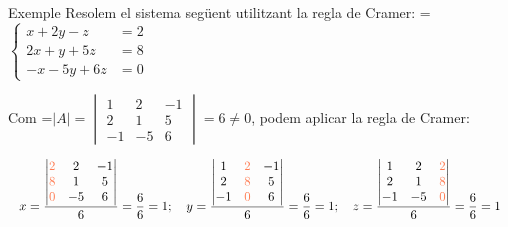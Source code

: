 \documentclass[11pt,a4paper]{article}
\newcommand{\fmm}[1]{\setbox0=\hbox{$#1$}\ifdim\wd0>\linewidth\fmdisp{#1}\else\mbox{\box0}\fi}
\newcommand{\fmdisp}[1]{\[\setbox2=\hbox{$\displaystyle #1$}\ifdim\wd2>\linewidth\resizebox{\linewidth}{!}{\box2}\else\box2\fi\]}
\begin{document}
\begin{fmex}{Exemple}
Resolem el sistema següent utilitzant la regla de Cramer: \fmm{\left\{\begin{aligned}x+2y-z&=2\\ 2x+y+5z&=8\\ -x-5y+6z&=0\end{aligned}\right.}

Com \fmm{|A|=\begin{vmatrix}1 & 2 & -1\\ 2 & 1 & 5\\ -1 & -5 & 6\end{vmatrix}=6\neq0}, podem aplicar la regla de Cramer:

\fmdisp{x=\frac{\begin{vmatrix}\color[HTML]{ff7a50}2 & 2 & -1\\ \color[HTML]{ff7a50}8 & 1 & 5\\ \color[HTML]{ff7a50}0 & -5 & 6\end{vmatrix}}{6}=\frac{6}{6}=1;\quad y=\frac{\begin{vmatrix}1 & \color[HTML]{ff7a50}2 & -1\\ 2 & \color[HTML]{ff7a50}8 & 5\\ -1 & \color[HTML]{ff7a50}0 & 6\end{vmatrix}}{6}=\frac{6}{6}=1;\quad z=\frac{\begin{vmatrix}1 & 2 & \color[HTML]{ff7a50}2\\ 2 & 1 & \color[HTML]{ff7a50}8\\ -1 & -5 & \color[HTML]{ff7a50}0\end{vmatrix}}{6}=\frac{6}{6}=1}

\end{fmex}
\end{document}
